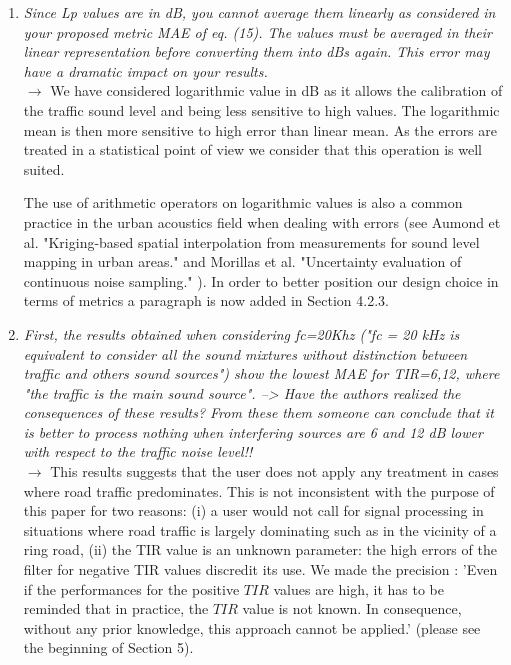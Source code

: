 \documentclass[10pt]{article}
\begin{document}
\begin{enumerate}
\item \emph{Since Lp values are in dB, you cannot average them linearly as considered in your proposed metric MAE of eq. (15). The values must be averaged in their linear representation before converting them into dBs again. This error may have a dramatic impact on your results.}\\
$\rightarrow$ We have considered logarithmic value in dB as it allows the calibration of the traffic sound level and being less sensitive to high values.
The logarithmic mean is then more sensitive to high error than linear mean. As the errors are treated in a statistical point of view we consider that this operation is well suited.

The use of arithmetic operators on logarithmic values is also a common practice in the urban acoustics field when dealing with errors (see Aumond et al. "Kriging-based spatial interpolation from measurements for sound level mapping in urban areas." \cite{aumond2018kriging}  and Morillas et al. "Uncertainty evaluation of continuous noise sampling." \cite{morillas2014uncertainty}). In order to  better position our design choice in terms of metrics a paragraph is now added in Section 4.2.3. %

\item \emph{First, the results obtained when considering fc=20Khz ("fc = 20 kHz is equivalent to consider all the sound mixtures without distinction between traffic and others sound sources") show the lowest MAE for TIR={6,12}, where "the traffic is the main sound source".
--> Have the authors realized the consequences of these results? From these them someone can conclude that it is better to process nothing when interfering sources are 6 and 12 dB lower with respect to the traffic noise level!!}\\
$\rightarrow$ This results suggests that the user does not apply any treatment in cases where road traffic predominates. This is not inconsistent with the purpose of this paper for two reasons: (i) a user would not call for signal processing in situations where road traffic is largely dominating such as in the vicinity of a ring road, (ii) the TIR value is an unknown parameter: the high errors of the filter for negative TIR values discredit its use. We made the precision :
'Even if the performances for the positive $TIR$ values are high, it has to be reminded that in practice, the $TIR$ value is not known. In consequence, without any prior knowledge, this approach cannot be applied.' (please see the beginning of Section 5).




\end{enumerate}
\end{document}
